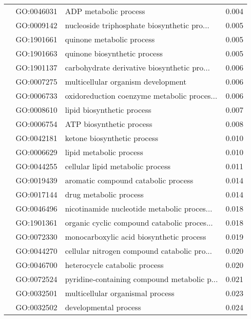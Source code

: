 \begin{longtable}{lllr}
   & GO:0046031 &                        ADP metabolic process &         0.004 \\
   & GO:0009142 &  nucleoside triphosphate biosynthetic pro... &         0.005 \\
   & GO:1901661 &                    quinone metabolic process &         0.005 \\
   & GO:1901663 &                 quinone biosynthetic process &         0.005 \\
   & GO:1901137 &  carbohydrate derivative biosynthetic pro... &         0.006 \\
   & GO:0007275 &           multicellular organism development &         0.006 \\
   & GO:0006733 &  oxidoreduction coenzyme metabolic proces... &         0.006 \\
   & GO:0008610 &                   lipid biosynthetic process &         0.007 \\
   & GO:0006754 &                     ATP biosynthetic process &         0.008 \\
   & GO:0042181 &                  ketone biosynthetic process &         0.010 \\
   & GO:0006629 &                      lipid metabolic process &         0.010 \\
   & GO:0044255 &             cellular lipid metabolic process &         0.011 \\
   & GO:0019439 &          aromatic compound catabolic process &         0.014 \\
   & GO:0017144 &                       drug metabolic process &         0.014 \\
   & GO:0046496 &  nicotinamide nucleotide metabolic proces... &         0.018 \\
   & GO:1901361 &  organic cyclic compound catabolic proces... &         0.018 \\
   & GO:0072330 &     monocarboxylic acid biosynthetic process &         0.019 \\
   & GO:0044270 &  cellular nitrogen compound catabolic pro... &         0.020 \\
   & GO:0046700 &                heterocycle catabolic process &         0.020 \\
   & GO:0072524 &  pyridine-containing compound metabolic p... &         0.021 \\
   & GO:0032501 &             multicellular organismal process &         0.023 \\
   & GO:0032502 &                        developmental process &         0.024 \\

\end{longtable}
